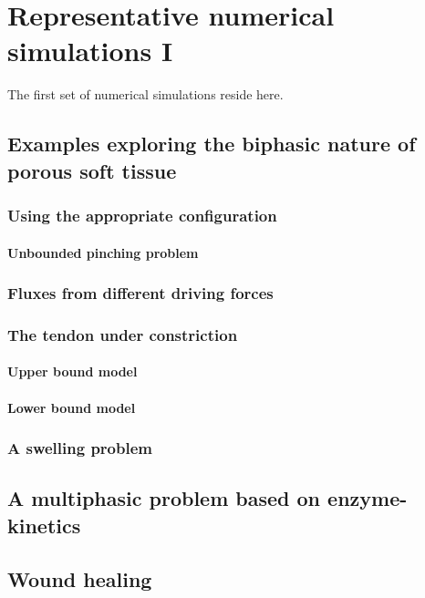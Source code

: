 \chapter{Representative numerical simulations I}
\label{numerical-simulations-1}

The first set of numerical simulations reside here.

\section{Examples exploring the biphasic nature of porous soft tissue}
\label{biphasic-examples-1}

\subsection{Using the appropriate configuration}
\label{biphasic-examples-1}

\subsubsection{Unbounded pinching problem}
\label{unbounded-pinching}

\subsection{Fluxes from different driving forces}
\label{flux-driving-forces}

\subsection{The tendon under constriction}
\label{constriction-1}

\subsubsection{Upper bound model}
\label{upper-bound}

\subsubsection{Lower bound model}
\label{lower-bound}

\subsection{A swelling problem}
\label{swelling-1}

\section{A multiphasic problem based on enzyme-kinetics}
\label{enzyme-kinetics}

\section{Wound healing}
\label{wound-healing}
